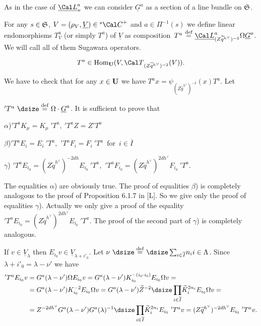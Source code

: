   As in the case of  $\underline{\Cal L}^a_u$  we can consider
$\underline{G}^a$  as a section of a line bundle on ${\frak S}$.
\enddemo

  For any $s \in {\frak S}$, $V = (\rho_V,\underline{V})
\in
{}^s{\Cal C}^+$  and  $a \in \Pi^{-1}(s)$  we define linear endomorphisms
$T^a_V$ (or simply $T^a$) of  $\underline{V}$  as composition\
$T^a\ {\buildrel{\text{def}}\over =}\
\underline{\Cal L}^a_{(Z\widetilde{q}^{h^\vee})^{-2}} \Omega \underline{G}^a$.
We will call all of them Sugawara operators.
\endproclaim

$$
T^a \in \text{Hom}_{\bold U}(V, {\Cal
T}_{(Z{\widetilde{q}}^{h^\vee})^{-2}}(V)).
$$
\endproclaim

  We have to check that for any  $x \in {\bold U}$  we have
$T^ax = \psi_{(Z{\widetilde q}^{h^\vee})^{-2}}(x) T^a$.  Let

\noindent
$'T^a\ {\dsize\buildrel{\text{def}}\over =}\ \Omega \cdot \underline{G}^a$.
It is sufficient to prove that

\noindent
$\alpha$)\quad $'T^a K_\mu = K_\mu\ {}'T^a,\ 'T^a Z = Z 'T^a$

\noindent
$\beta$)\quad $'T^a E_i = E_i\ {}'T^a$,\ $'T^a F_i = F_i\ {}'T^a$\ for\ $i \in
\overline{I}$

\noindent
$\gamma$)  $'T^a E_{i_0} = (Z{\widetilde q}^{h^\vee})^{-2dh} E_{i_0}\
{}'T^a$,\
$'T^a F_{i_0} = (Z{\widetilde q}^{h^\vee})^{2dh^\vee} F_{i_0}\ {}'T^a$.

\noindent
The equalities $\alpha$) are obviously true.  The proof of equalities
$\beta$) is completely analogous to the proof of Proposition 6.1.7 in [L].
So we give only the proof of equalities  $\gamma$).  Actually we only give a
proof of the equality  $'T^a E_{i_0} = (Z{\widetilde q^{h^\vee}})^{2dh^\vee}
E_{i_0}\ {}'T^a$.  The proof of the second part of  $\gamma$) is completely
analogous.
\enddemo

If  $v \in \underline{V}_\lambda$ then  $E_{i_0}v \in \underline{V}_{\lambda +
i'_0}$.  Let  $\nu\ {\dsize\buildrel {\text{def}}\over =}\
{\dsize\sum_{i\in \overline{I}}} n_i i \in \Lambda$.  Since
$\lambda + i'_0 = \lambda - \nu'$  we have
$$
\aligned
'T^a E_{i_0} v &= G^a(\lambda - \nu') \Omega E_{i_0} v = G^a(\lambda - \nu')
K_{i_0}^{-(i_0\cdot i_0)} E_{i_0} \Omega v = \\
&= G^a(\lambda - \nu') K_{i_0}^{-2} E_{i_0} \Omega v = G^a(\lambda - \nu')
\widetilde{Z}^{-2} {\dsize\prod_{i\in \overline{I}}}
\widetilde{K}_i^{2n_i} E_{i_0} \Omega v = \\
&= Z^{-2dh^\vee} G^a(\lambda -\nu')G^a(\lambda)^{-1}
{\dsize\prod_{i\in \overline{I}}} \widetilde{K}_i^{2n_i}  E_{i_0}\ {}'T^av =
(Z \widetilde{q}^{h^\vee})^{-2dh^\vee} E_{i_0}\ {}'T^av.
\endaligned
$$

